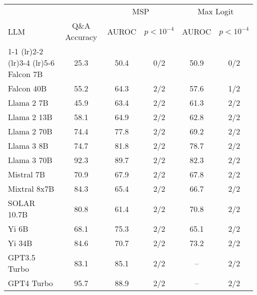 \begin{table*}[h]
\centering
\caption{AUROC results for ARC-Challenge. See Table~\ref{tab:arc_auroc} for more explanation.}
\label{tab:arc_auroc}
\begin{tabular}{lccccc}
\toprule
& & \multicolumn{2}{c}{MSP} & \multicolumn{2}{c}{Max Logit} \\ 
LLM & Q\&A Accuracy & AUROC & $p < 10^{-4}$ & AUROC & $p < 10^{-4}$ \\ 
\cmidrule(lr){1-1} \cmidrule(lr){2-2} \cmidrule(lr){3-4} \cmidrule(lr){5-6} 
Falcon 7B & 25.3 & 50.4 & 0/2 & 50.9 & 0/2\\
Falcon 40B & 55.2 & 64.3 & 2/2 & 57.6 & 1/2\\
Llama 2 7B & 45.9 & 63.4 & 2/2 & 61.3 & 2/2\\
Llama 2 13B & 58.1 & 64.9 & 2/2 & 62.8 & 2/2\\
Llama 2 70B & 74.4 & 77.8 & 2/2 & 69.2 & 2/2\\
Llama 3 8B & 74.7 & 81.8 & 2/2 & 78.7 & 2/2\\
Llama 3 70B & 92.3 & 89.7 & 2/2 & 82.3 & 2/2\\
Mistral 7B & 70.9 & 67.9 & 2/2 & 67.8 & 2/2\\
Mixtral 8x7B & 84.3 & 65.4 & 2/2 & 66.7 & 2/2\\
SOLAR 10.7B & 80.8 & 61.4 & 2/2 & 70.8 & 2/2\\
Yi 6B & 68.1 & 75.3 & 2/2 & 65.1 & 2/2\\
Yi 34B & 84.6 & 70.7 & 2/2 & 73.2 & 2/2\\
GPT3.5 Turbo & 83.1 & 85.1 & 2/2 & -- & 2/2\\
GPT4 Turbo & 95.7 & 88.9 & 2/2 & -- & 2/2\\
\bottomrule
\end{tabular}
\end{table*}
